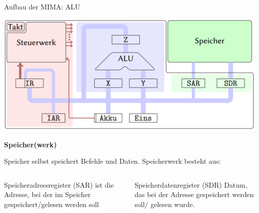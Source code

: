 \begin{frame}{Aufbau der MIMA: ALU}
\begin{center}\includegraphics[width=.6\textwidth]{images/mima_aufbau.png}\end{center}

\bp

\textcolor{kit-green50}{\textbf{Speicher(werk)}}

Speicher selbst speichert Befehle und Daten. \ip Speicherwerk besteht aus:

\begin{columns}
	\begin{column}{0.5\textwidth}
		\begin{itemize}
			\pitem Speicheradressregister (SAR) ist die Adresse, bei der im Speicher gespeichert/gelesen werden soll
		\end{itemize}
	\end{column}
	
	\begin{column}{0.5\textwidth}
		\begin{itemize}
			\pitem Speicherdatenregister (SDR) Datum, das bei der Adresse gespeichert werden soll/ gelesen wurde.
		\end{itemize}
	\end{column}
\end{columns}

\end{frame}


